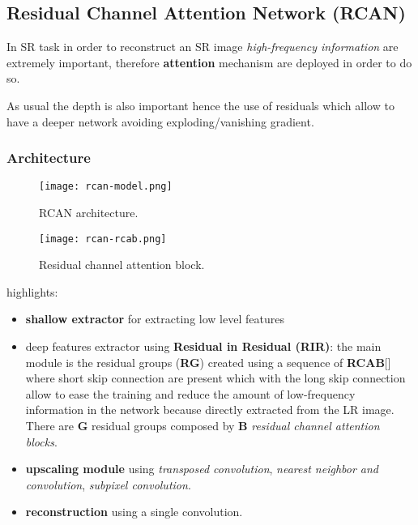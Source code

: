 \subsection{Residual Channel Attention Network (RCAN\cite{RCAN})}\label{rcan}

In SR task in order to reconstruct an SR image \textit{high-frequency information} are extremely important, therefore \textbf{attention} mechanism are deployed in order to do so.

As usual the depth is also important hence the use of residuals which allow to have a deeper network avoiding exploding/vanishing gradient.

\subsubsection{Architecture}
\begin{figure}
    \centering
    \texttt{[image: rcan-model.png]}
    \caption{RCAN architecture.}\label{rcan:model}
\end{figure}
\begin{figure}
    \centering
    \texttt{[image: rcan-rcab.png]}
    \caption{Residual channel attention block.}\label{rcan:rcab}
\end{figure}


 highlights:
\begin{itemize}
    \item \textbf{shallow extractor} for extracting low level features
    \item deep features extractor using \textbf{Residual in Residual (RIR)}: the main module is the residual groups (\textbf{RG}) created using a sequence of \textbf{RCAB}[] where short skip connection are present which with the long skip connection allow to ease the training and reduce the amount of low-frequency information in the network because directly extracted from the LR image.
    There are \textbf{G} residual groups composed by \textbf{B} \textit{residual channel attention blocks}.
    \item \textbf{upscaling module} using \textit{transposed convolution}, \textit{nearest neighbor and convolution}, \textit{subpixel convolution}.
    \item \textbf{reconstruction} using a single convolution.
\end{itemize}

